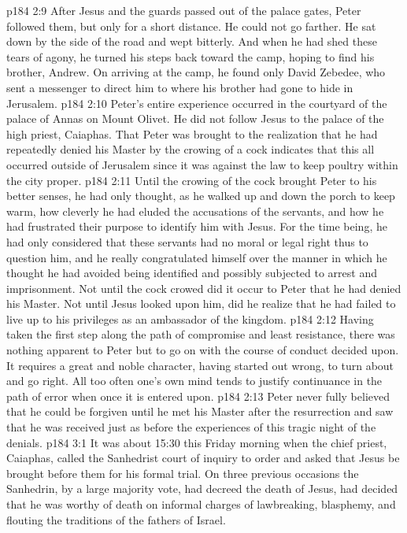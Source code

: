 \vs p184 2:9 After Jesus and the guards passed out of the palace gates, Peter followed them, but only for a short distance. He could not go farther. He sat down by the side of the road and wept bitterly. And when he had shed these tears of agony, he turned his steps back toward the camp, hoping to find his brother, Andrew. On arriving at the camp, he found only David Zebedee, who sent a messenger to direct him to where his brother had gone to hide in Jerusalem.
\vs p184 2:10 \pc Peter’s entire experience occurred in the courtyard of the palace of Annas on Mount Olivet. He did not follow Jesus to the palace of the high priest, Caiaphas. That Peter was brought to the realization that he had repeatedly denied his Master by the crowing of a cock indicates that this all occurred outside of Jerusalem since it was against the law to keep poultry within the city proper.
\vs p184 2:11 \pc Until the crowing of the cock brought Peter to his better senses, he had only thought, as he walked up and down the porch to keep warm, how cleverly he had eluded the accusations of the servants, and how he had frustrated their purpose to identify him with Jesus. For the time being, he had only considered that these servants had no moral or legal right thus to question him, and he really congratulated himself over the manner in which he thought he had avoided being identified and possibly subjected to arrest and imprisonment. Not until the cock crowed did it occur to Peter that he had denied his Master. Not until Jesus looked upon him, did he realize that he had failed to live up to his privileges as an ambassador of the kingdom.
\vs p184 2:12 Having taken the first step along the path of compromise and least resistance, there was nothing apparent to Peter but to go on with the course of conduct decided upon. It requires a great and noble character, having started out wrong, to turn about and go right. All too often one’s own mind tends to justify continuance in the path of error when once it is entered upon.
\vs p184 2:13 Peter never fully believed that he could be forgiven until he met his Master after the resurrection and saw that he was received just as before the experiences of this tragic night of the denials.
\vs p184 3:1 It was about 15:30 this Friday morning when the chief priest, Caiaphas, called the Sanhedrist court of inquiry to order and asked that Jesus be brought before them for his formal trial. On three previous occasions the Sanhedrin, by a large majority vote, had decreed the death of Jesus, had decided that he was worthy of death on informal charges of lawbreaking, blasphemy, and flouting the traditions of the fathers of Israel.
